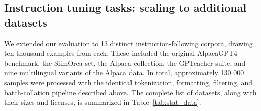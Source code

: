 \subsection{Instruction tuning tasks: scaling to additional datasets}

We extended our evaluation to 13 distinct instruction‐following corpora, drawing ten thousand examples from each. These included the original AlpacaGPT4 benchmark\cite{alpaca-gpt4}, the SlimOrca set\cite{slimorca}, the Alpaca collection\cite{alpaca}, the GPTeacher suite\cite{gpteacher}, and nine multilingual variants of the Alpaca data. In total, approximately 130 000 samples were processed with the identical tokenization, formatting, filtering, and batch‐collation pipeline described above. The complete list of datasets, along with their sizes and licenses, is summarized in Table~\ref{tab:stat_data}.

